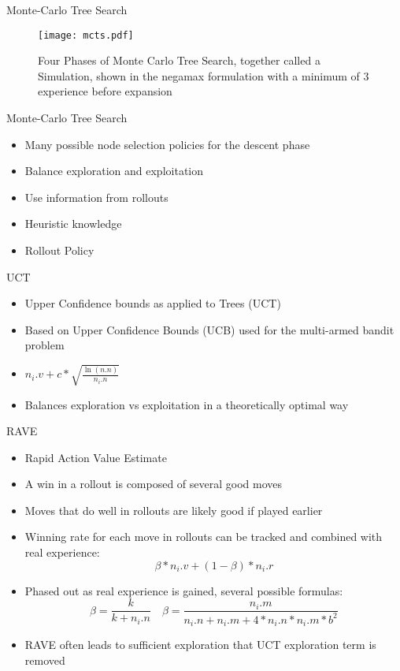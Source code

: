 \documentclass{beamer} %
\begin{document}
\begin{frame}{Monte-Carlo Tree Search}
\begin{figure}
	\centering
\texttt{[image: mcts.pdf]}
\caption[Four Phases of Monte Carlo Tree Search]{Four Phases of Monte Carlo Tree Search, together called a Simulation, shown in the negamax formulation with a minimum of 3 experience before expansion}
\label{fig:mcts}
\end{figure}
\end{frame}

\begin{frame}{Monte-Carlo Tree Search}
\begin{itemize}
	\item Many possible node selection policies for the descent phase
	\item Balance exploration and exploitation
	\item Use information from rollouts
	\item Heuristic knowledge
	\item Rollout Policy
\end{itemize}
\end{frame}


\begin{frame}{UCT}
\begin{itemize}
	\item Upper Confidence bounds as applied to Trees (UCT)
	\item Based on Upper Confidence Bounds (UCB) used for the multi-armed bandit problem
	\item $ n_i.v + c*\sqrt{\frac{\ln(n.n)}{n_i.n}} $
	\item Balances exploration vs exploitation in a theoretically optimal way
\end{itemize}
\end{frame}


\begin{frame}{RAVE}
\begin{itemize}
	\item Rapid Action Value Estimate
	\item A win in a rollout is composed of several good moves
	\item Moves that do well in rollouts are likely good if played earlier
	\item Winning rate for each move in rollouts can be tracked and combined with real experience: $$ \beta*n_i.v + (1-\beta)*n_i.r $$
	\item Phased out as real experience is gained, several possible formulas: $$ \beta = \frac{k}{k+n_i.n} \quad \beta = \frac{n_i.m}{n_i.n+n_i.m+4*n_i.n*n_i.m*b^2}$$
	\item RAVE often leads to sufficient exploration that UCT exploration term is removed
\end{itemize}
\end{frame}
\end{document}
